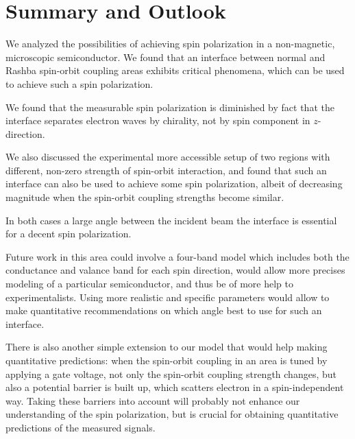 \chapter{Summary and Outlook}

We analyzed the possibilities of achieving spin polarization in a
non-magnetic, microscopic semiconductor. We found that an interface between
normal and Rashba spin-orbit coupling areas exhibits critical phenomena, which
can be used to achieve such a spin polarization.

We found that the measurable spin polarization is diminished by fact that the
interface separates electron waves by chirality, not by spin component
in $z$-direction.

We also discussed the experimental more accessible setup of two regions with
different, non-zero strength of spin-orbit interaction, and found that such an
interface can also be used to achieve some spin polarization, albeit
of decreasing magnitude when the spin-orbit coupling strengths become similar. 

In both cases a large angle between the incident beam the interface is
essential for a decent spin polarization.


Future work in this area could involve a four-band model which includes both
the conductance and valance band for each spin direction, would
allow more precises modeling of a particular semiconductor, and thus be of
more help to experimentalists. Using more realistic and specific parameters
would allow to make quantitative recommendations on which angle best to use
for such an interface.

There is also another simple extension to our model that would help making
quantitative predictions: when the spin-orbit coupling in an area is tuned by
applying a gate voltage, not only the spin-orbit coupling strength changes,
but also a potential barrier is built up, which scatters electron in a
spin-independent way. Taking these barriers into account will probably not
enhance our understanding of the spin polarization, but is crucial for
obtaining quantitative predictions of the measured signals.


